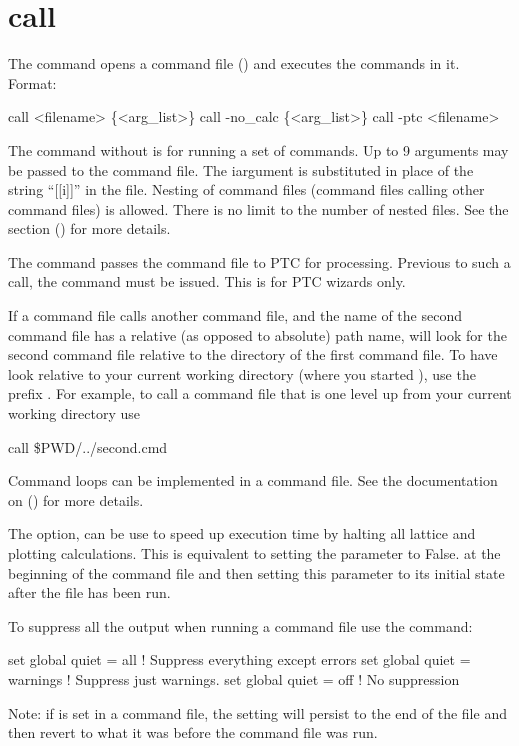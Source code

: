 \section{call}
\label{s:call}

The  command opens a command file () and executes the commands in
it. Format: 
\vskip 1pt
\begin{example}
  call <filename> \{<arg_list>\}
  call -no_calc \{<arg_list>\}
  call -ptc <filename>
\end{example}

\vskip 1pt 
The  command without  is for running a set of \tao commands.  Up to 9
arguments may be passed to the command file. The i\Th argument is substituted in place of the string
``[[i]]'' in the file. Nesting of command files (command files calling other command files) is
allowed. There is no limit to the number of nested files.  See the 
section () for more details.

The  command passes the command file to PTC for processing. Previous to such a call,
the command  must be issued. This is for PTC wizards only.

If a command file calls another command file, and the name of the second command file has a relative
(as opposed to absolute) path name, \tao will look for the second command file relative to the
directory of the first command file. To have \tao look relative to your current working directory
(where you started \tao), use the prefix . For example, to call a command file that is
one level up from your current working directory use
\begin{example}
  call \$PWD/../second.cmd
\end{example}

Command loops can be implemented in a command file. See the documentation on 
() for more details.

The  option, can be use to speed up execution time by halting all lattice and plotting
calculations. This is equivalent to setting the  parameter  to False.
at the beginning of the command file and then setting this parameter to its initial state 
after the file has been run.

To suppress all the output when running a command file use the command:
\begin{example}
  set global quiet = all       ! Suppress everything except errors
  set global quiet = warnings  ! Suppress just warnings.
  set global quiet = off       ! No suppression
\end{example}
Note: if  is set in a command file, the setting will persist to the end of the file and then
revert to what it was before the command file was run.

